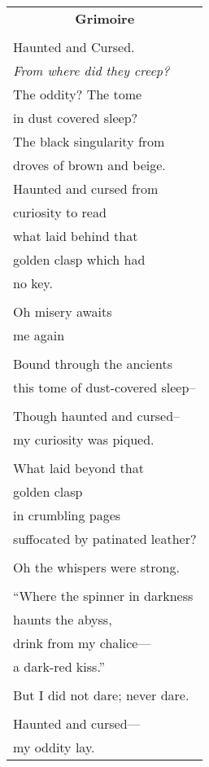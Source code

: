 \documentclass{article}
\begin{document}
\newcommand{\h}{\hspace*{4ex}}

\begin{center}
\begin{tabular}{l}
\multicolumn{1}{c}{\large\textbf{Grimoire}} \\
\\
Haunted and Cursed. \\
\textit{From where did they creep?} \\
The oddity? The tome \\
in dust covered sleep? \\
The black singularity from \\
droves of brown and beige. \\
Haunted and cursed from \\
curiosity to read \\
what laid behind that \\
golden clasp which had \\
no key. \\
\\
Oh misery awaits \\
       me again \\
\\
Bound through the ancients \\
   this tome of dust-covered sleep-- \\
\\
Though haunted and cursed-- \\
    my curiosity was piqued. \\
\\
What laid beyond that \\
    golden clasp \\
in crumbling pages \\
    suffocated by patinated leather? \\
\\
Oh the whispers were strong. \\
\\
``Where the spinner in darkness \\
haunts the abyss, \\
drink from my chalice--- \\
a dark-red kiss.'' \\
\\
But I did not dare; never dare. \\
\\
Haunted and cursed--- \\
   my oddity lay. \\

\end{tabular}
\end{center}
\end{document}
